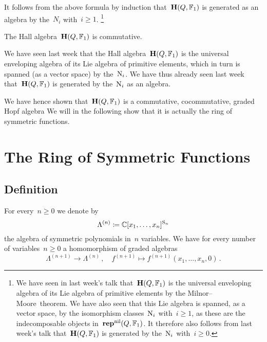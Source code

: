 \documentclass[a4paper,11pt]{scrartcl}
\begin{document}
\begin{example}
\begin{enumerate}
      It follows from the above formula by induction that~$\mathbf{H}(Q, \mathbb{F}_1)$ is generated as an algebra by the~$N_i$ with~$i \geq 1$.%
      \footnote{%
        We have seen in last week’s talk that~$\mathbf{H}(Q, \mathbb{F}_1)$ is the universal enveloping algebra of its Lie algebra of primitive elements by the Milnor--Moore~theorem.
        We have also seen that this Lie algebra is spanned, as a vector space, by the isomorphism classes~$\mathrm{N}_i$ with~$i \geq 1$, as these are the indecomposable objects in~$\mathbf{rep}^{\mathrm{nil}}(Q, \mathbb{F}_1)$.
        It therefore also follows from last week’s talk that~$\mathbf{H}(Q, \mathbb{F}_1)$ is generated by the~$\mathrm{N}_i$ with~$i \geq 0$.
      }
  \end{enumerate}
\end{example}

\begin{corollary}
  The Hall algebra~$\mathbf{H}(Q, \mathbb{F}_1)$ is commutative.
\end{corollary}

\begin{remark}
  We have seen last week that the Hall algebra~$\mathbf{H}(Q, \mathbb{F}_1)$ is the universal enveloping algebra of its Lie algebra of primitive elements, which in turn is spanned (as a vector space) by the~$\mathrm{N}_i$.
  We have thus already seen last week that~$\mathbf{H}(Q, \mathbb{F}_1)$ is generated by the~$\mathrm{N}_i$ as an algebra.
\end{remark}

We have hence shown that~$\mathbf{H}(Q, \mathbb{F}_1)$ is a commutative, cocommutative, graded Hopf algebra
We will in the following show that it is actually the ring of symmetric functions.





\section{The Ring of Symmetric Functions}



\subsection{Definition}

For every~$n \geq 0$ we denote by
\[
  \Lambda^{(n)}
  \coloneqq
  \mathbb{C}[x_1, \dotsc, x_n]^{\mathrm{S}_n}
\]
the algebra of symmetric polynomials in~$n$ variables.
We have for every number of variables~$n \geq 0$ a homomorphism of graded algebras
\[
  \Lambda^{(n+1)} \to \Lambda^{(n)} \,,
  \quad
  f^{(n+1)}
  \mapsto
  f^{(n+1)}(x_1, \dotsc, x_n, 0) \,.
\]
\end{document}
